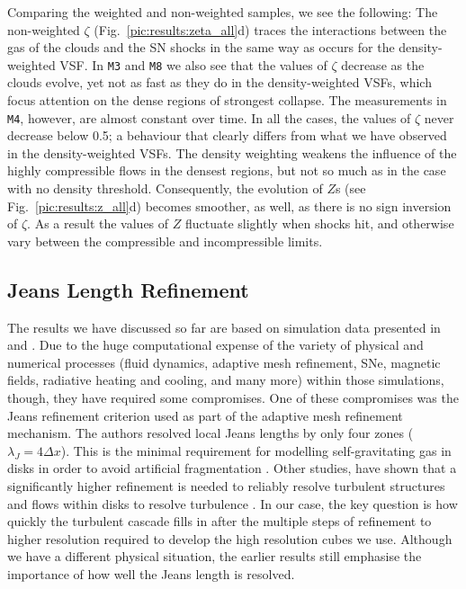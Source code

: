 Comparing the weighted and non-weighted samples, we see the following:
The non-weighted $\zeta$ (Fig.~\ref{pic:results:zeta_all}d) traces the interactions between the gas of the clouds and the SN shocks in the same way as occurs for the density-weighted VSF.
In \texttt{M3} and \texttt{M8} we also see that the values of $\zeta$ decrease as the clouds evolve, yet not as fast as they do in the density-weighted VSFs, which focus attention on the dense regions of strongest collapse. 
The measurements in \texttt{M4}, however, are almost constant over time. 
In all the cases, the values of $\zeta$ never decrease below 0.5; a behaviour that clearly differs from what we have observed in the density-weighted VSFs. 
The density weighting weakens the influence of the highly compressible flows in the densest regions, but not so much as in the case with no density threshold. 
Consequently, the evolution of $Z$s (see Fig.~\ref{pic:results:z_all}d) becomes smoother, as well, as there is no sign inversion of $\zeta$.
As a result the values of $Z$ fluctuate slightly when shocks hit, and otherwise vary between the compressible and incompressible limits.



\subsection{Jeans Length Refinement}\label{results:refinement}

The results we have discussed so far are based on simulation data presented in  and .
Due to the huge computational expense of the variety of physical and numerical processes (fluid dynamics, adaptive mesh refinement, SNe, magnetic fields, radiative heating and cooling, and many more) within those simulations, though, they have required some compromises.
One of these compromises was the Jeans refinement criterion used as part of the adaptive mesh refinement mechanism.
The authors resolved local Jeans lengths by only four zones ($\lambda_J=4\Delta x$).
This is the minimal requirement for modelling self-gravitating gas in disks in order to avoid artificial fragmentation \citep{Truelove1998}. 
Other studies, have shown that a significantly higher refinement is needed to reliably resolve turbulent structures and flows within disks to resolve turbulence \citep{Federrath2011, Turk2012}.  
In our case, the key question is how quickly the turbulent cascade fills in after the multiple steps of refinement to higher resolution required to develop the high resolution cubes we use.  
Although we have a different physical situation, the earlier results still emphasise the importance of how well the Jeans length is resolved.

